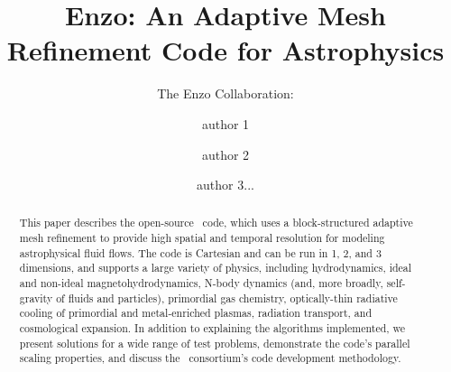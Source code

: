 \documentclass[onecolumn,iop]{emulateapj}  %
\begin{document}
\title{Enzo: An Adaptive Mesh Refinement Code for Astrophysics}
\author{The Enzo Collaboration:}
\author{author 1}
\author{author 2}
\author{author 3...}


\begin{abstract}
This paper describes the open-source \enzo\ code, which uses a
block-structured adaptive mesh refinement to provide high spatial and
temporal resolution for modeling astrophysical fluid flows.  The code
is Cartesian and can be run in 1, 2, and 3 dimensions, and supports a
large variety of physics, including hydrodynamics, ideal and non-ideal
magnetohydrodynamics, N-body dynamics (and, more broadly, self-gravity
of fluids and particles), primordial gas chemistry, optically-thin
radiative cooling of primordial and metal-enriched plasmas, radiation
transport, and cosmological expansion.  In addition to explaining the
algorithms implemented, we present solutions for a wide range of test
problems, demonstrate the code's parallel scaling properties, and
discuss the \enzo\ consortium's code development methodology.
\end{abstract}


\maketitle





\end{document}
